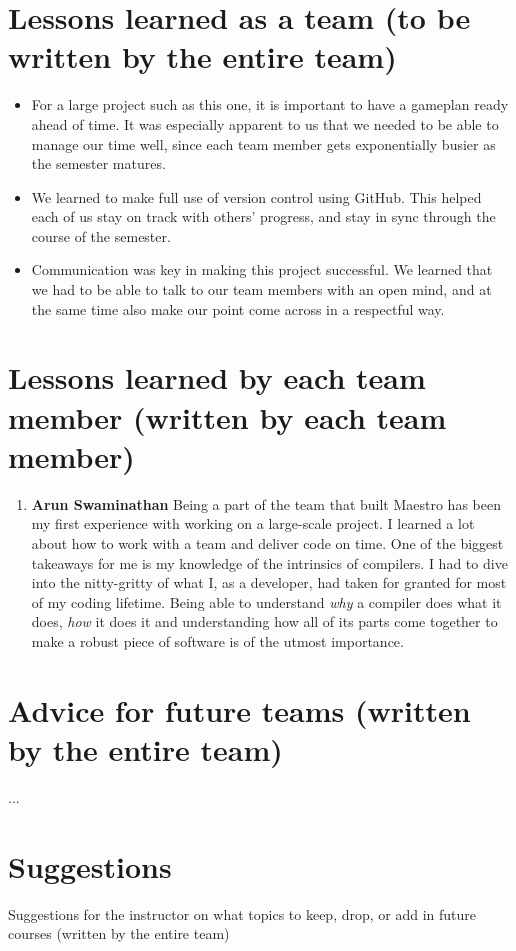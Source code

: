 
\section{Lessons learned as a team (to be written by the entire team)}
\begin{itemize}
\item For a large project such as this one, it is important to have a gameplan ready ahead of time. It was especially apparent to us that we needed to be able to manage our time well, since each team member gets exponentially busier as the semester matures. 
\item We learned to make full use of version control using GitHub. This helped each of us stay on track with others' progress, and stay in sync through the course of the semester.
\item Communication was key in making this project successful. We learned that we had to be able to talk to our team members with an open mind, and at the same time also make our point come across in a respectful way.
\end{itemize}


\section{Lessons learned by each team member (written by each team member)}
\begin{enumerate}
\item \textbf{Arun Swaminathan} \newline
Being a part of the team that built Maestro has been my first experience with working on a large-scale project. I learned a lot about how to work with a team and deliver code on time.
One of the biggest takeaways for me is my knowledge of the intrinsics of compilers. I had to dive into the nitty-gritty of what I, as a developer, had taken for granted for most of my coding lifetime. Being able to understand \textit{why} a compiler does what it does, \textit{how} it does it and understanding how all of its parts come together to make a robust piece of software is of the utmost importance.

\end{enumerate}
\section{Advice for future teams (written by the entire team)}
...
\section{Suggestions}
Suggestions for the instructor on what topics to keep, drop, or add in future courses (written by the entire team)
